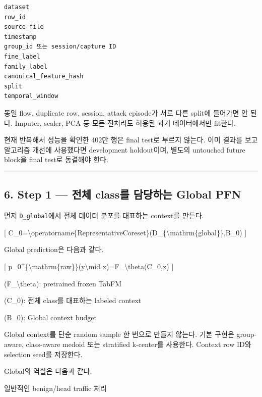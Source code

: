 \begin{Verbatim}[breaklines=true,breakanywhere=true,fontsize=\scriptsize]
dataset
row_id
source_file
timestamp
group_id 또는 session/capture ID
fine_label
family_label
canonical_feature_hash
split
temporal_window

\end{Verbatim}
동일 flow, duplicate row, session, attack episode가 서로 다른 split에 들어가면 안 된다. Imputer, scaler, PCA 등 모든 전처리도 허용된 과거 데이터에서만 fit한다.

현재 반복해서 성능을 확인한 402만 행은 final test로 부르지 않는다. 이미 결과를 보고 알고리즘 개선에 사용했다면 development holdout이며, 별도의 untouched future block을 final test로 동결해야 한다.


\medskip\hrule\medskip
\subsection{6. Step 1 — 전체 class를 담당하는 Global PFN}
먼저 \texttt{D\_\allowbreak{}\allowbreak{}global\allowbreak{}}에서 전체 데이터 분포를 대표하는 context를 만든다.

[ C\_\allowbreak{}0=\allowbreak{}\textbackslash{}operatorname\{RepresentativeCoreset\}(D\_\allowbreak{}\{\textbackslash{}mathrm\{global\}\},B\_\allowbreak{}0) ]

Global prediction은 다음과 같다.

[ p\_\allowbreak{}0\textasciicircum{}\{\textbackslash{}mathrm\{raw\}\}(y\textbackslash{}mid x)=\allowbreak{}F\_\allowbreak{}\textbackslash{}theta(C\_\allowbreak{}0,x) ]

\par\noindent \textbullet\enspace (F\_\allowbreak{}\textbackslash{}theta): pretrained frozen TabFM


\par\noindent \textbullet\enspace (C\_\allowbreak{}0): 전체 class를 대표하는 labeled context


\par\noindent \textbullet\enspace (B\_\allowbreak{}0): Global context budget


Global context를 단순 random sample 한 번으로 만들지 않는다. 기본 구현은 group-aware, class-aware medoid 또는 stratified k-center를 사용한다. Context row ID와 selection seed를 저장한다.

Global의 역할은 다음과 같다.

\par\noindent \textbullet\enspace 일반적인 benign/\allowbreak{}head traffic 처리


